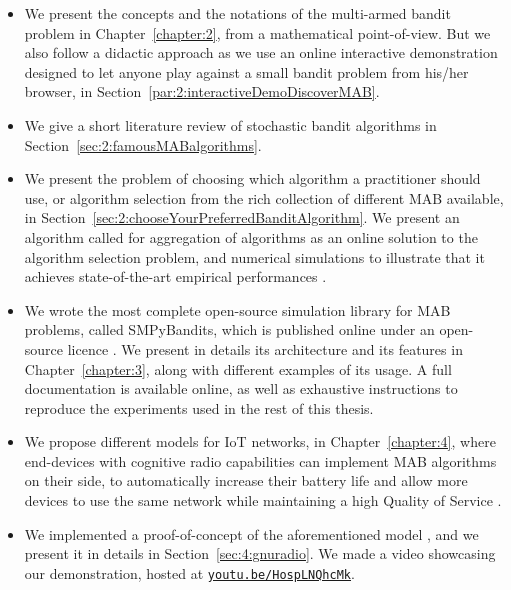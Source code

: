 \begin{itemize}
    \item
    We present the concepts and the notations of the multi-armed bandit problem in Chapter~\ref{chapter:2}, from a mathematical point-of-view.
    But we also follow a didactic approach as we use an online interactive demonstration designed to let anyone play against a small bandit problem from his/her browser, in Section~\ref{par:2:interactiveDemoDiscoverMAB}.

    \item
    We give a short literature review of stochastic bandit algorithms in Section~\ref{sec:2:famousMABalgorithms}.

    \item
    We present the problem of choosing which algorithm a practitioner should use, or algorithm selection from the rich collection of different MAB available, in Section~\ref{sec:2:chooseYourPreferredBanditAlgorithm}.
    We present an algorithm called \Aggr{} for aggregation of algorithms as an online solution to the algorithm selection problem, and numerical simulations to illustrate that it achieves state-of-the-art empirical performances
    \cite{Besson2018WCNC}.

    \item
    We wrote the most complete open-source simulation library for MAB problems, called SMPyBandits, which is published online under an open-source licence \cite{SMPyBandits,SMPyBanditsJMLR}.
    We present in details its architecture and its features in Chapter~\ref{chapter:3}, along with different examples of its usage.
    A full documentation is available online, as well as exhaustive instructions to reproduce the experiments used in the rest of this thesis.

    \item
    We propose different models for IoT networks, in Chapter~\ref{chapter:4}, where end-devices with cognitive radio capabilities can implement MAB algorithms on their side, to automatically increase their battery life and allow more devices to use the same network while maintaining a high Quality of Service
    \cite{Bonnefoi17,Besson2019WCNC,Bonnefoi2019WCNC}.

    \item
    We implemented a proof-of-concept of the aforementioned model \cite{Besson2018ICT}, and we present it in details in Section~\ref{sec:4:gnuradio}. We made a video showcasing our demonstration, hosted at \texttt{\href{https://youtu.be/HospLNQhcMk}{youtu.be/HospLNQhcMk}}.


\end{itemize}
